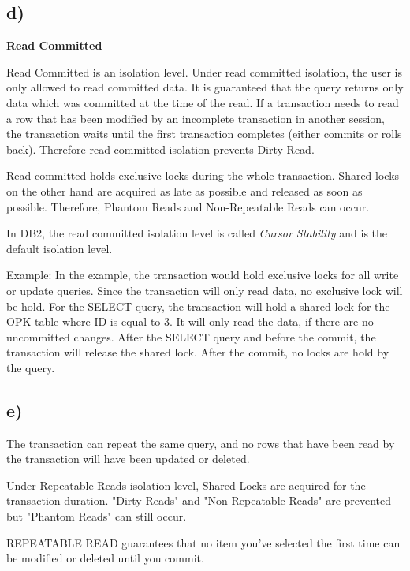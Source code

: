\documentclass[ngerman]{dis-template-add}
\begin{document}
\subsection*{d)}

\textbf{Read Committed}

Read Committed is an isolation level.
Under read committed isolation, the user is only allowed to read committed data.
It is guaranteed that the query returns only data which was committed at the time of the read.
If a transaction needs to read a row that has been modified by an incomplete transaction in another session, the transaction waits until the first transaction completes (either commits or rolls back).
Therefore read committed isolation prevents Dirty Read.

Read committed holds exclusive locks during the whole transaction.
Shared locks on the other hand are acquired as late as possible and released as soon as possible.
Therefore, Phantom Reads and Non-Repeatable Reads can occur.

In DB2, the read committed isolation level is called \textit{Cursor Stability} and is the default isolation level.

Example:
In the example, the transaction would hold exclusive locks for all write or update queries. Since the transaction will only read data, no exclusive lock will be hold.
For the SELECT query, the transaction will hold a shared lock for the OPK table where ID is equal to 3. It will only read the data, if there are no uncommitted changes.
After the SELECT query and before the commit, the transaction will release the shared lock.
After the commit, no locks are hold by the query.


\subsection*{e)}




The transaction can repeat the same query, and no rows that have been read by the transaction will have been updated or deleted.



Under Repeatable Reads isolation level, Shared Locks are acquired for the transaction duration. "Dirty Reads" and "Non-Repeatable Reads" are prevented but "Phantom Reads" can still occur.

REPEATABLE READ guarantees that no item you've selected the first time can be modified or deleted until you commit.
\end{document}
